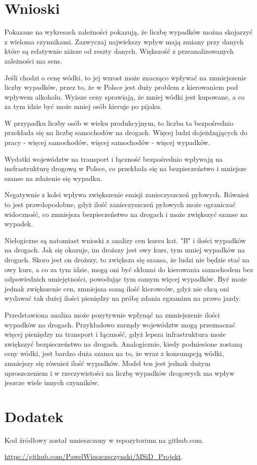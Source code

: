 \documentclass[10pt]{article}
\begin{document}
\section{Wnioski}
Pokazane na wykresach zależności pokazują, że liczbę wypadków można skojarzyć z wieloma czynnikami. Zazwyczaj najwiekszy wpływ mają zmiany przy danych które są relatywnie niższe od reszty danych. Większość z przeanalizowanych zależności ma sens. 

Jeśli chodzi o cenę wódki, to jej wzrost może znacząco wpływać na zmniejszenie liczby wypadków, przez to, że w Polsce jest duży problem z kierowaniem pod wpływem alkoholu. Wyższe ceny sprawiają, że mniej wódki jest kupowane, a co za tym idzie być może mniej osób kieruje po pijaku.

W przypadku liczby osób w wieku produkcyjnym, to liczba ta bezpośrednio przekłada się na liczbę samochodów na drogach. Więcej ludzi dojeżdząjących do pracy - więcej samochodów, więcej samochodów - więcej wypadków.

Wydatki województw na transport i łączność bezpośrednio wpływają na insfrastrukturę drogową w Polsce, co przekłada się na bezpieczeństwo i mniejsze szanse na zdażenie się wypadku.

Negatywnie z kolei wpływa zwiększenie emisji zanieczyszczeń pyłowych. Również to jest prawdopodobne, gdyż ilość zanieczyszczeń pyłowych może ograniczać widoczność, co zmniejsza bezpieczeństwo na drogach i może zwiększyć szanse na wypadek.

Nielogiczne są natomiast wnioski z analizy cen kursu kat. "B" i ilości wypadków na drogach. Jak się okazuje, im droższy jest owy kurs, tym mniej wypadków na drogach. Skoro jest on droższy, to zwiększa się szansa, że ludzi nie będzie stać na owy kurs, a co za tym idzie, mogą oni być skłonni do kierowania samochodem bez odpowiednich umiejętności, powodując tym samym więcej wypadków. Być może jednak zwiększenie cen, zmniejsza samą ilość kierowców, gdyż nie chcą oni wydawać tak dużej ilości pieniędzy na próbę zdania egzaminu na prawo jazdy.

Przedstawiona analiza może pozytywnie wpłynąć na zmniejszenie ilości wypadków na drogach. Przykładowo zarządy województw mogą przeznaczać więcej pieniędzy na transport i łączność, gdyż lepsza infrastruktura może zwiększyć bezpieczeństwo na drogach. Analogicznie, kiedy podniesione zostaną ceny wódki, jest bardzo duża szansa na to, że wraz z konsumpcją wódki, zmniejszy się również ilość wypadków. Model ten jest jednak dużym uproszczeniem i w rzeczywistości na liczbę wypadków drogowych ma wpływ jeszcze wiele innych czynników. 

\appendix
\section{Dodatek}
Kod źródłowy został umieszczony w repozytorium na github.com.

\noindent \url{https://github.com/PawelWieszczeczynski/MSiD_Projekt}.
\end{document}
